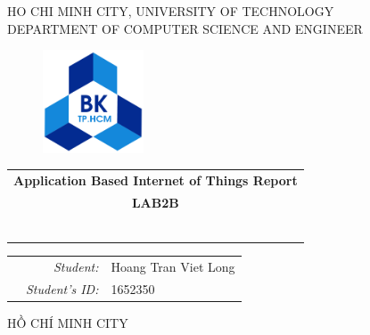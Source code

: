 \documentclass[a4paper,11pt]{article}
\theoremstyle{mytheor}
\begin{document}
\begin{titlepage}
\begin{center}
HO CHI MINH CITY, UNIVERSITY OF TECHNOLOGY \\
DEPARTMENT OF COMPUTER SCIENCE AND ENGINEER
\end{center}

\vspace{1cm}

\begin{figure}[h!]
\begin{center}
\includegraphics[width=3cm]{hcmut.png}
\end{center}
\end{figure}

\vspace{2cm}


\begin{center}
\begin{tabular}{c}
\multicolumn{1}{c}{\textbf{{\Large Application Based Internet of Things Report }}}\\
\multicolumn{1}{c}{\textbf{{\Large LAB2B}}}


~~\\

\\
\multicolumn{1}{l}{\textbf{{\Large}}}\\
\\
\textbf{{\Large}}\\

\\
\\

\end{tabular}
\end{center}

\vspace{3cm}

\begin{table}[h]
\begin{tabular}{rrl}
\hspace{5.1cm} 
&\textit{Student: } & Hoang Tran Viet Long\\
&\textit{Student's ID: } & 1652350 \\

\end{tabular}
\end{table}
\vspace{3cm}
\begin{center}
{\footnotesize HỒ CHÍ MINH CITY}
\end{center}
\end{titlepage}
\end{document}
